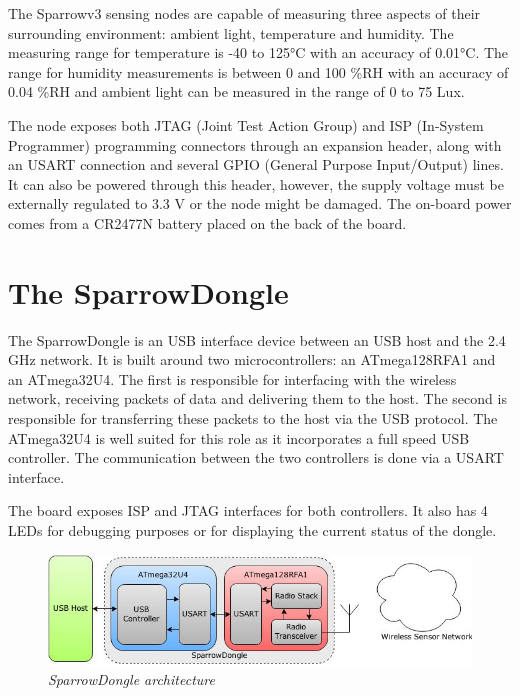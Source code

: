 The Sparrowv3 sensing nodes are capable of measuring three aspects of their
surrounding environment: ambient light, temperature and humidity. The measuring
range for temperature is -40 to 125°C with an accuracy of 0.01°C. The range for
humidity measurements is between 0 and 100 \%RH with an accuracy of 0.04 \%RH
and ambient light can be measured in the range of 0 to 75 Lux.

The node exposes both JTAG (Joint Test Action Group) and ISP (In-System
Programmer) programming connectors through an expansion header, along with an
USART connection and several GPIO (General Purpose Input/Output) lines. It can
also be powered through this header, however, the supply voltage must be
externally regulated to 3.3 V or the node might be damaged.  The on-board power
comes from a CR2477N battery placed on the back of the board.

\section{The SparrowDongle}

The SparrowDongle is an USB interface device between an USB host and the 2.4
GHz network. It is built around two microcontrollers: an \mbox{ATmega128RFA1}
and an \mbox{ATmega32U4}. The first is responsible for interfacing with the
wireless network, receiving packets of data and delivering them to the host.
The second is responsible for transferring these packets to the host via the
USB protocol.  The \mbox{ATmega32U4} is well suited for this role as it
incorporates a full speed USB controller. The communication between the two
controllers is done via a USART interface.

The board exposes ISP and JTAG interfaces for both controllers. It also has 4
LEDs for debugging purposes or for displaying the current status of the dongle.

\begin{figure}[ht]
	\begin{center}
		\includegraphics[width=\textwidth]{img/sparrowdongle.jpg}
	\end{center}
	\caption{\small \itshape{SparrowDongle architecture}}
\end{figure}


